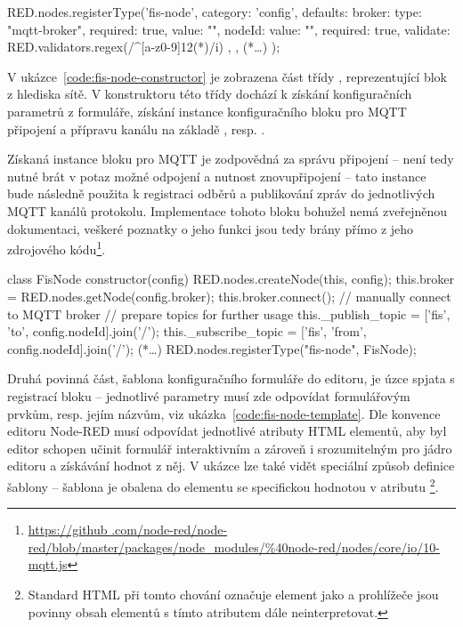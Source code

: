 \begin{code}[
    language=Javascript,
    label=code:fis-node-editor,
    caption={Registrace vlastního bloku do editoru sítě v nástroji Node-RED.}
]
RED.nodes.registerType('fis-node', {
    category: 'config',
    defaults: {
        broker: {type: "mqtt-broker", required: true, value: ""},
        nodeId: {
            value: "", required: true,
            validate: RED.validators.regex(/^[a-z0-9]{12}(*\textdollar*)/i)
        },
    },
    (*\ldots*)
});
\end{code}

V ukázce~\ref{code:fis-node-constructor} je zobrazena část třídy , reprezentující blok z hlediska sítě. V
konstruktoru této třídy dochází k získání konfiguračních
parametrů z formuláře, získání instance konfiguračního bloku pro MQTT připojení a přípravu kanálu na základě
, resp. .

Získaná instance bloku pro MQTT je zodpovědná za správu připojení -- není tedy nutné brát v potaz možné odpojení a
nutnost znovupřipojení -- tato instance bude následně použita k registraci odběrů a publikování zpráv do jednotlivých
MQTT kanálů protokolu.
Implementace tohoto bloku bohužel nemá zveřejněnou dokumentaci, veškeré poznatky o jeho funkci jsou tedy brány přímo
z jeho zdrojového kódu\footnote{\url{https://github
.com/node-red/node-red/blob/master/packages/node_modules/\%40node-red/nodes/core/io/10-mqtt.js}}.

\begin{code}[
    language=Javascript,
    label=code:fis-node-constructor,
    caption={Část konstruktoru třídy \ic{FisNode} obluhující připojení MQTT brokeru a přípravu kanálů pro komunikaci.}
]
class FisNode {
    constructor(config) {
        RED.nodes.createNode(this, config);
        this.broker = RED.nodes.getNode(config.broker);
        this.broker.connect(); // manually connect to MQTT broker
        // prepare topics for further usage
        this._publish_topic = ['fis', 'to', config.nodeId].join('/');
        this._subscribe_topic = ['fis', 'from', config.nodeId].join('/');
    }
    (*\ldots*)
    RED.nodes.registerType("fis-node", FisNode);
}
\end{code}

Druhá povinná část, šablona konfiguračního formuláře do editoru, je úzce spjata s registrací bloku -- jednotlivé
parametry musí zde odpovídat formulářovým prvkům, resp. jejím názvům, viz ukázka~\ref{code:fis-node-template}.
Dle konvence editoru Node-RED musí odpovídat jednotlivé atributy HTML elementů, aby byl editor schopen učinit
formulář interaktivním a zároveň i srozumitelným pro jádro editoru a získávání hodnot z něj.
V ukázce lze také vidět speciální způsob definice šablony -- šablona je obalena do elementu  se
specifickou hodnotou v atributu \footnote{Standard HTML při tomto chování označuje
element  jako  a prohlížeče jsou povinny obsah elementů s tímto atributem dále
neinterpretovat.}.

